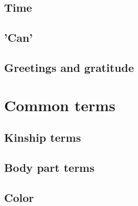 \section{Time}
\section{'Can'}
\section{Greetings and gratitude}
\chapter{Common terms}
\section{Kinship terms}
\section{Body part terms}
\section{Color}
